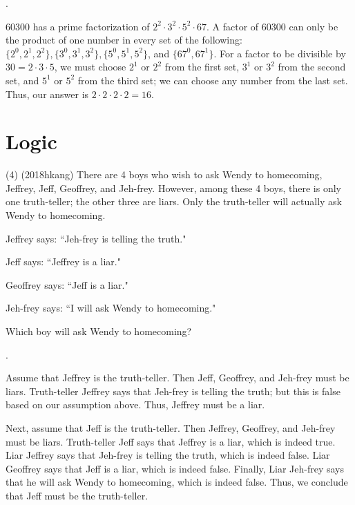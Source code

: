 \documentclass[11pt]{article}
\begin{document}
\begin{answer}
.
\end{answer}

\begin{solution}
60300 has a prime factorization of $2^2\cdot3^2\cdot5^2\cdot67$. A factor of 60300 can only be the product of one number in every set of the following: $\{2^0, 2^1, 2^2\}, \{3^0, 3^1, 3^2\}, \{5^0, 5^1, 5^2\}$, and $\{67^0, 67^1\}$. For a factor to be divisible by $30 = 2\cdot3\cdot5$, we must choose $2^1$ or $2^2$ from the first set, $3^1$ or $3^2$ from the second set, and $5^1$ or $5^2$ from the third set; we can choose any number from the last set. Thus, our answer is $2\cdot2\cdot2\cdot2 = 16$.
\end{solution}

\section{Logic}
\begin{problem}
(4) (2018hkang) There are 4 boys who wish to ask Wendy to homecoming, Jeffrey, Jeff, Geoffrey, and Jeh-frey. However, among these 4 boys, there is only one truth-teller; the other three are liars. Only the truth-teller will actually ask Wendy to homecoming. 

Jeffrey says: ``Jeh-frey is telling the truth."

Jeff says: ``Jeffrey is a liar."

Geoffrey says: ``Jeff is a liar."

Jeh-frey says: ``I will ask Wendy to homecoming."

Which boy will ask Wendy to homecoming?
\end{problem}

\begin{answer}
.
\end{answer}

\begin{solution}
Assume that Jeffrey is the truth-teller. Then Jeff, Geoffrey, and Jeh-frey must be liars. Truth-teller Jeffrey says that Jeh-frey is telling the truth; but this is false based on our assumption above. Thus, Jeffrey must be a liar.

Next, assume that Jeff is the truth-teller. Then Jeffrey, Geoffrey, and Jeh-frey must be liars. Truth-teller Jeff says that Jeffrey is a liar, which is indeed true. Liar Jeffrey says that Jeh-frey is telling the truth, which is indeed false. Liar Geoffrey says that Jeff is a liar, which is indeed false. Finally, Liar Jeh-frey says that he will ask Wendy to homecoming, which is indeed false. Thus, we conclude that Jeff must be the truth-teller.
\end{solution}
\end{document}
